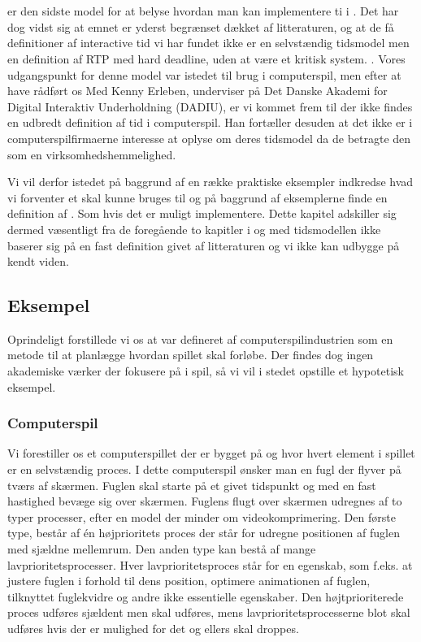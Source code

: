 \chapter{\is}
\label{chap:is}

\is er den sidste model for at belyse hvordan man kan implementere ti i \pycsp. Det har dog vidst sig at emnet er yderst begrænset dækket af litteraturen, og at de få definitioner af interactive tid vi har fundet ikke er en selvstændig tidsmodel men en definition af RTP med hard deadline, uden at være et kritisk system. \cite{?}. Vores udgangspunkt for denne model var istedet til brug i computerspil, men efter at have rådført os Med Kenny Erleben, underviser på  Det Danske Akademi for Digital Interaktiv Underholdning (DADIU), er vi kommet frem til der ikke findes en udbredt definition af tid i computerspil. Han fortæller desuden at  det ikke er i computerspilfirmaerne interesse at  oplyse om deres tidsmodel da de  betragte den som en  virksomhedshemmelighed. 

Vi vil derfor istedet på baggrund af en række praktiske eksempler indkredse hvad vi forventer et \is skal kunne bruges til og på  baggrund af eksemplerne finde en definition af \is. Som hvis det er muligt implementere. Dette kapitel adskiller sig dermed væsentligt fra de foregående to kapitler i og med tidsmodellen  ikke baserer sig på en fast definition givet af litteraturen og vi ikke kan udbygge på kendt viden.

\section{Eksempel}
Oprindeligt forstillede vi os at \is var defineret af computerspilindustrien som en metode til at planlægge hvordan spillet skal forløbe. Der findes dog ingen akademiske værker der fokusere på \is i spil, så vi vil i stedet opstille et hypotetisk eksempel. 

\subsection*{Computerspil}
Vi forestiller os et computerspillet der er bygget på \pycsp og hvor hvert element i spillet er en selvstændig proces. I dette computerspil ønsker man en fugl der flyver på tværs af skærmen. Fuglen skal starte på et givet tidspunkt og med en fast hastighed bevæge sig over skærmen. Fuglens flugt over skærmen udregnes af to typer processer, efter en model der minder om videokomprimering. Den første type, består af én højprioritets proces der står for udregne positionen af fuglen med sjældne mellemrum. Den anden type kan bestå af mange lavprioritetsprocesser. Hver lavprioritetsproces står for en egenskab, som  f.eks. at justere fuglen i forhold til dens position, optimere animationen af fuglen, tilknyttet fuglekvidre og andre ikke essentielle egenskaber.  Den højtprioriterede proces udføres sjældent men skal udføres, mens lavprioritetsprocesserne blot skal udføres hvis der er mulighed for det og ellers skal droppes.

